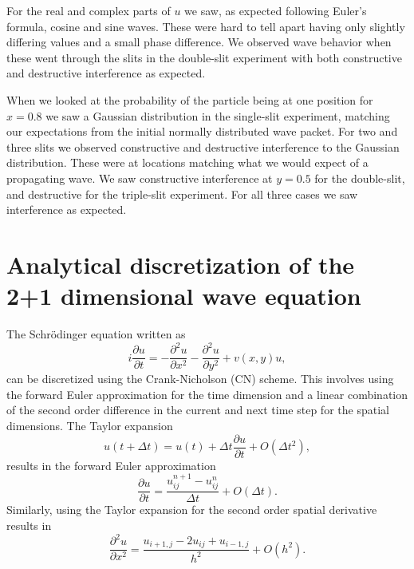 \documentclass[english,notitlepage,reprint,nofootinbib]{revtex4-1}  %
\begin{document}
For the real and complex parts of $u$ we saw, as expected following Euler's formula, cosine and sine waves. These were hard to tell apart having only slightly differing values and a small phase difference. We observed wave behavior when these went through the slits in the double-slit experiment with both constructive and destructive interference as expected.

When we looked at the probability of the particle being at one position for $x=0.8$ we saw a Gaussian distribution in the single-slit experiment, matching our expectations from the initial normally distributed wave packet. For two and three slits we observed constructive and destructive interference to the Gaussian distribution. These were at locations matching what we would expect of a propagating wave. We saw constructive interference at $y=0.5$ for the double-slit, and destructive for the triple-slit experiment. For all three cases we saw interference as expected.
\onecolumngrid

%


\newpage
\appendix

\section{Analytical discretization of the 2+1 dimensional wave equation} \label{appendix:analytic}

The Schrödinger equation written as
\begin{equation}
    i \frac{\partial u}{\partial t} = - \frac{\partial^2 u}{\partial x^2} - \frac{\partial^2 u}{\partial y^2} + v(x,y)u, \label{eq:wave_eq_appendix}
\end{equation}
can be discretized using the Crank-Nicholson (CN) scheme. This involves using the forward Euler approximation for the time dimension and a linear combination of the second order difference in the current and next time step for the spatial dimensions. The Taylor expansion
\begin{equation}
    u(t + \Delta t ) = u(t) + \Delta t \frac{\partial u}{\partial t} + O(\Delta t^2),
\end{equation}
results in the forward Euler approximation
\begin{equation}
    \frac{\partial u}{\partial t} = \frac{u_{ij}^{n+1} - u_{ij}^n}{\Delta t} + O(\Delta t). \label{eq:partial_t}
\end{equation}
Similarly, using the Taylor expansion for the second order spatial derivative results in
\begin{equation}
    \frac{\partial^2 u}{\partial x^2} = \frac{u_{i+1,j} -2u_{ij} + u_{i-1,j}}{h^2} + O(h^2).
\end{equation}
\end{document}
